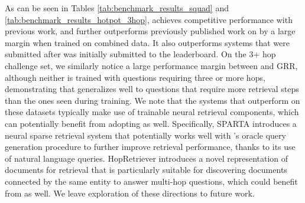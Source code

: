 As can be seen in Tables \ref{tab:benchmark_results_squad} and \ref{tab:benchmark_results_hotpot_3hop}, \irrr{} achieves competitive performance with previous work, and further outperforms previously published work on \squadopen{} by a large margin when trained on combined data.
It also outperforms systems that were submitted after \irrr{} was initially submitted to the \hotpotqa{} leaderboard.
On the 3+ hop challenge set, we similarly notice a large performance margin between \irrr{} and GRR, although neither is trained with questions requiring three or more hops, demonstrating that \irrr{} generalizes well to questions that require more retrieval steps than the ones seen during training.
We note that the systems that outperform \irrr{} on these datasets typically make use of trainable neural retrieval components, which \irrr{} can potentially benefit from adopting as well.
Specifically, SPARTA \citep{zhao2020sparta} introduces a neural sparse retrieval system that potentially works well with \irrr{}'s oracle query generation procedure to further improve retrieval performance, thanks to its use of natural language queries.
HopRetriever \citep{li2020hopretriever} introduces a novel representation of documents for retrieval that is particularly suitable for discovering documents connected by the same entity to answer multi-hop questions, which \irrr{} could benefit from as well.
We leave exploration of these directions to future work.

